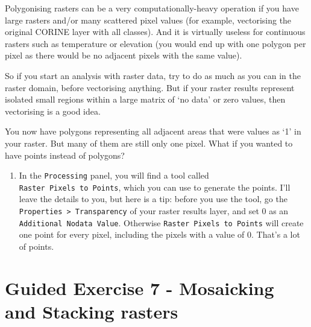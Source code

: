 \documentclass[
  letterpaper,
  DIV=11,
  numbers=noendperiod]{scrreprt}
\providecommand{\tightlist}{%
  \setlength{\itemsep}{0pt}\setlength{\parskip}{0pt}}\usepackage{longtable,booktabs,array}
\begin{document}
\begin{tcolorbox}[enhanced jigsaw, breakable, toptitle=1mm, colback=white, left=2mm, leftrule=.75mm, titlerule=0mm, colframe=quarto-callout-warning-color-frame, opacityback=0, title=\textcolor{quarto-callout-warning-color}{\faExclamationTriangle}\hspace{0.5em}{Warning}, toprule=.15mm, opacitybacktitle=0.6, bottomtitle=1mm, colbacktitle=quarto-callout-warning-color!10!white, bottomrule=.15mm, coltitle=black, rightrule=.15mm, arc=.35mm]

Polygonising rasters can be a very computationally-heavy operation if
you have large rasters and/or many scattered pixel values (for example,
vectorising the original CORINE layer with all classes). And it is
virtually useless for continuous rasters such as temperature or
elevation (you would end up with one polygon per pixel as there would be
no adjacent pixels with the same value).

So if you start an analysis with raster data, try to do as much as you
can in the raster domain, before vectorising anything. But if your
raster results represent isolated small regions within a large matrix of
`no data' or zero values, then vectorising is a good idea.

\end{tcolorbox}

You now have polygons representing all adjacent areas that were values
as `1' in your raster. But many of them are still only one pixel. What
if you wanted to have points instead of polygons?

\begin{enumerate}
\def\labelenumi{(\arabic{enumi})}
\setcounter{enumi}{180}
\tightlist
\item
  In the \texttt{Processing} panel, you will find a tool called
  \texttt{Raster\ Pixels\ to\ Points}, which you can use to generate the
  points. I'll leave the details to you, but here is a tip: before you
  use the tool, go the \texttt{Properties\ \textgreater{}\ Transparency}
  of your raster results layer, and set 0 as an
  \texttt{Additional\ Nodata\ Value}. Otherwise
  \texttt{Raster\ Pixels\ to\ Points} will create one point for every
  pixel, including the pixels with a value of 0. That's a lot of points.
\end{enumerate}

\section{Guided Exercise 7 - Mosaicking and Stacking
rasters}\label{guided-exercise-7---mosaicking-and-stacking-rasters}
\end{document}
